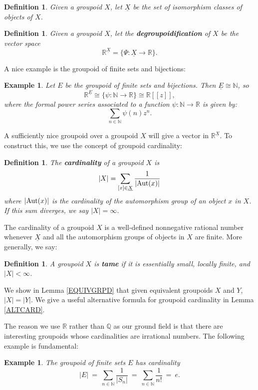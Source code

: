 \documentclass{article}
\renewcommand{\to}{\rightarrow}
\newcommand{\maps}{\colon}
\newcommand{\iso}{\cong}
\newcommand{\R}{{\mathbb R}}
\newcommand{\N}{{\mathbb N}}
\newcommand{\Q}{{\mathbb Q}}
\newcommand{\Aut}{{\rm Aut}}
\renewcommand{\u}[1]{\underline{#1}}
\newtheorem{definition}[thm]{Definition}
\newtheorem{example}[thm]{Example}
\begin{document}
\begin{definition}
Given a groupoid $X$, let $\u{X}$ be the set of isomorphism
classes of objects of $X$.
\end{definition}
\begin{definition}
\label{vectorspace}
Given a groupoid $X$, let the {\bf degroupoidification} of $X$ be
the vector space
\[ \R^{\u{X}} = \lbrace \Psi \maps \u{X} \to \R \rbrace. \]
\end{definition}

A nice example is the groupoid of finite sets and bijections:
\begin{example}
\label{power_series}
\textup{
Let $E$ be the groupoid of finite sets and bijections. Then
$\u{E}\iso \N$, so
\[ \R^{\u{E}} \iso \lbrace \psi \maps \N \to \R \rbrace 
\cong \R[[z]] , \]
where the formal power series associated to a function $\psi
\maps \N \to \R$ is given by:
\[  \sum_{n\in\N}\psi(n)z^n. \]
}
\end{example}

A sufficiently nice groupoid over a groupoid $X$ will give a vector
in $\R^{\u{X}}$.  To construct this, we use the concept of
groupoid cardinality:

\begin{definition}
The {\bf cardinality} of a groupoid $X$ is
\[ |X| = \sum_{[x]\in \u{X}} \frac{1}{|\Aut(x)|} \]
where $|\Aut(x)|$ is the cardinality of the automorphism group of an object
$x$ in $X$.  If this sum diverges, we say $|X| = \infty$.
\end{definition}

The cardinality of a groupoid $X$ is a well-defined nonnegative rational
number whenever $\u{X}$ and all the automorphism groups of
objects in $X$ are finite.  More generally, we say:

\begin{definition}
A groupoid $X$ is {\bf tame} if it is essentially small,
locally finite, and $|X| < \infty$.
\end{definition}
\noindent
We show in Lemma \ref{EQUIVGRPD} that given equivalent groupoids
$X$ and $Y$, $|X| = |Y|$.  We give a useful alternative formula
for groupoid cardinality in Lemma \ref{ALTCARD}.

The reason we use $\R$ rather than $\Q$ as our ground field is that
there are interesting groupoids whose cardinalities are irrational numbers.
The following example is fundamental:

\begin{example}
\textup{
The groupoid of finite sets $E$ has cardinality
\[ |E| ~=~ \sum_{n \in \N} \frac{1}{|S_n|} ~=~ 
\sum_{n \in \N} \frac{1}{n!} ~=~ e. \]
}
\end{example}
\end{document}
